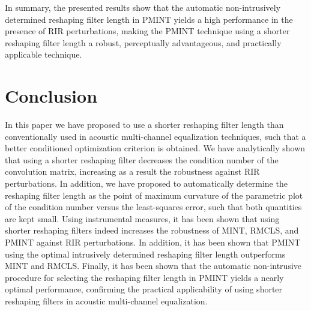 \documentclass[twocolumn]{bmcart}%
\begin{document}
In summary, the presented results show that the automatic non-intrusively determined reshaping filter length in PMINT yields a high performance in the presence of RIR perturbations, making the PMINT technique using a shorter reshaping filter length a robust, perceptually advantageous, and practically applicable technique.

\section{Conclusion}
In this paper we have proposed to use a shorter reshaping filter length than conventionally used in acoustic multi-channel equalization techniques, such that a better conditioned optimization criterion is obtained.
We have analytically shown that using a shorter reshaping filter decreases the condition number of the convolution matrix, increasing as a result the robustness against RIR perturbations.
In addition, we have proposed to automatically determine the reshaping filter length as the point of maximum curvature of the parametric plot of the condition number versus the least-squares error, such that both quantities are kept small.
Using instrumental measures, it has been shown that using shorter reshaping filters indeed increases the robustness of MINT, RMCLS, and PMINT against RIR perturbations.
In addition, it has been shown that PMINT using the optimal intrusively determined reshaping filter length outperforms MINT and RMCLS.
Finally, it has been shown that the automatic non-intrusive procedure for selecting the reshaping filter length in PMINT yields a nearly optimal performance, confirming the practical applicability of using shorter reshaping filters in acoustic multi-channel equalization.
\end{document}
